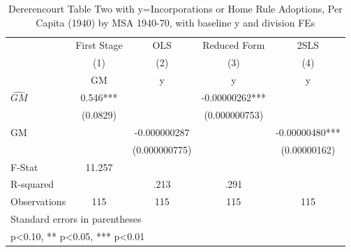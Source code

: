 \begin{table}[htbp]\centering
\def\sym#1{\ifmmode^{#1}\else\(^{#1}\)\fi}
\caption{Dererencourt Table Two with y=Incorporations or Home Rule Adoptions, Per Capita (1940) by MSA 1940-70, with baseline y and division FEs}
\begin{tabular}{l*{4}{c}}
\toprule
                    & First Stage   &         OLS   &Reduced Form   &        2SLS   \\
                    &\multicolumn{1}{c}{(1)}&\multicolumn{1}{c}{(2)}&\multicolumn{1}{c}{(3)}&\multicolumn{1}{c}{(4)}\\
                    &\multicolumn{1}{c}{GM}&\multicolumn{1}{c}{y}&\multicolumn{1}{c}{y}&\multicolumn{1}{c}{y}\\
\midrule
$\hat{GM}$          &       0.546***&               & -0.00000262***&               \\
                    &    (0.0829)   &               &(0.000000753)   &               \\
\addlinespace
GM                  &               &-0.000000287   &               & -0.00000480***\\
                    &               &(0.000000775)   &               &(0.00000162)   \\
\midrule
F-Stat              &      11.257   &               &               &               \\
R-squared           &               &        .213   &        .291   &               \\
Observations        &         115   &         115   &         115   &         115   \\
\bottomrule
\multicolumn{5}{l}{\footnotesize Standard errors in parentheses}\\
\multicolumn{5}{l}{\footnotesize * p<0.10, ** p<0.05, *** p<0.01}\\
\end{tabular}
\end{table}
